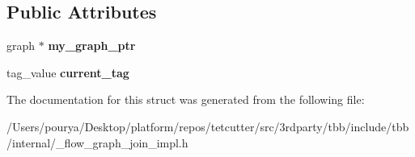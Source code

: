 \subsection*{Public Attributes}
\begin{DoxyCompactItemize}
\item 
\hypertarget{structinternal_1_1forwarding__base_a4f3717162113330f75ff25f847cb9f50}{}graph $\ast$ {\bfseries my\+\_\+graph\+\_\+ptr}\label{structinternal_1_1forwarding__base_a4f3717162113330f75ff25f847cb9f50}

\item 
\hypertarget{structinternal_1_1forwarding__base_a28d417ee2d31bce13ef0c35e96276b4e}{}tag\+\_\+value {\bfseries current\+\_\+tag}\label{structinternal_1_1forwarding__base_a28d417ee2d31bce13ef0c35e96276b4e}

\end{DoxyCompactItemize}


The documentation for this struct was generated from the following file\+:\begin{DoxyCompactItemize}
\item 
/\+Users/pourya/\+Desktop/platform/repos/tetcutter/src/3rdparty/tbb/include/tbb/internal/\+\_\+flow\+\_\+graph\+\_\+join\+\_\+impl.\+h\end{DoxyCompactItemize}

